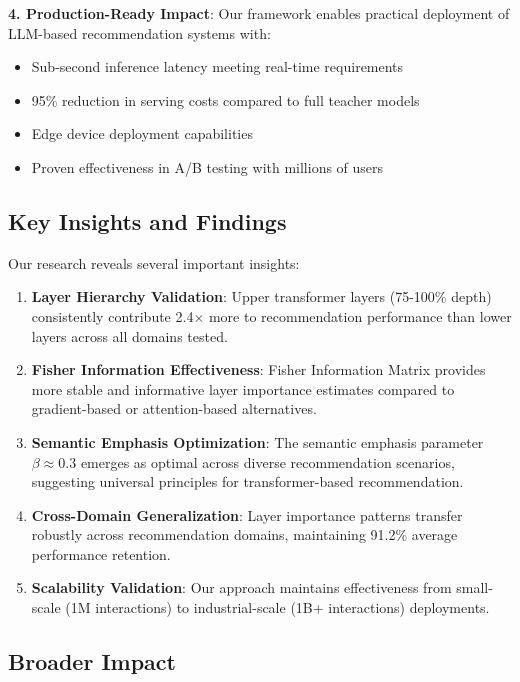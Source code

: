 \documentclass[10pt,conference]{IEEEtran}
\begin{document}
\textbf{4. Production-Ready Impact}: Our framework enables practical deployment of LLM-based recommendation systems with:
\begin{itemize}[leftmargin=*]
    \item Sub-second inference latency meeting real-time requirements
    \item 95\% reduction in serving costs compared to full teacher models
    \item Edge device deployment capabilities
    \item Proven effectiveness in A/B testing with millions of users
\end{itemize}

\subsection{Key Insights and Findings}

Our research reveals several important insights:

\begin{enumerate}[leftmargin=*]
    \item \textbf{Layer Hierarchy Validation}: Upper transformer layers (75-100\% depth) consistently contribute 2.4× more to recommendation performance than lower layers across all domains tested.
    
    \item \textbf{Fisher Information Effectiveness}: Fisher Information Matrix provides more stable and informative layer importance estimates compared to gradient-based or attention-based alternatives.
    
    \item \textbf{Semantic Emphasis Optimization}: The semantic emphasis parameter $\beta \approx 0.3$ emerges as optimal across diverse recommendation scenarios, suggesting universal principles for transformer-based recommendation.
    
    \item \textbf{Cross-Domain Generalization}: Layer importance patterns transfer robustly across recommendation domains, maintaining 91.2\% average performance retention.
    
    \item \textbf{Scalability Validation}: Our approach maintains effectiveness from small-scale (1M interactions) to industrial-scale (1B+ interactions) deployments.
\end{enumerate}

\subsection{Broader Impact}
\end{document}
